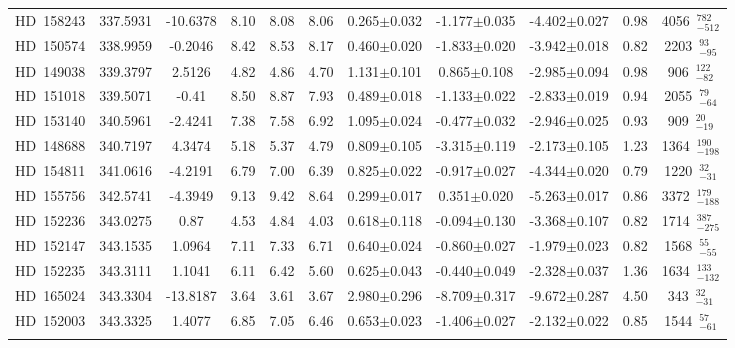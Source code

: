 {\begin{longtable}{lcccccccccc}
\noalign{\smallskip}
HD~158243 & 337.5931 & -10.6378 & 8.10 & 8.08 & 8.06 & 0.265$\pm$0.032 & -1.177$\pm$0.035 & -4.402$\pm$0.027 & 0.98 & 4056~$_{-512}^{782}$ \\
\noalign{\smallskip}
HD~150574 & 338.9959 & -0.2046 & 8.42 & 8.53 & 8.17 & 0.460$\pm$0.020 & -1.833$\pm$0.020 & -3.942$\pm$0.018 & 0.82 & 2203~$_{-95}^{93}$ \\
\noalign{\smallskip}
HD~149038 & 339.3797 & 2.5126 & 4.82 & 4.86 & 4.70 & 1.131$\pm$0.101 & 0.865$\pm$0.108 & -2.985$\pm$0.094 & 0.98 & 906~$_{-82}^{122}$ \\
\noalign{\smallskip}
HD~151018 & 339.5071 & -0.41 & 8.50 & 8.87 & 7.93 & 0.489$\pm$0.018 & -1.133$\pm$0.022 & -2.833$\pm$0.019 & 0.94 & 2055~$_{-64}^{79}$ \\
\noalign{\smallskip}
HD~153140 & 340.5961 & -2.4241 & 7.38 & 7.58 & 6.92 & 1.095$\pm$0.024 & -0.477$\pm$0.032 & -2.946$\pm$0.025 & 0.93 & 909~$_{-19}^{20}$ \\
\noalign{\smallskip}
HD~148688 & 340.7197 & 4.3474 & 5.18 & 5.37 & 4.79 & 0.809$\pm$0.105 & -3.315$\pm$0.119 & -2.173$\pm$0.105 & 1.23 & 1364~$_{-198}^{190}$ \\
\noalign{\smallskip}
HD~154811 & 341.0616 & -4.2191 & 6.79 & 7.00 & 6.39 & 0.825$\pm$0.022 & -0.917$\pm$0.027 & -4.344$\pm$0.020 & 0.79 & 1220~$_{-31}^{32}$ \\
\noalign{\smallskip}
HD~155756 & 342.5741 & -4.3949 & 9.13 & 9.42 & 8.64 & 0.299$\pm$0.017 & 0.351$\pm$0.020 & -5.263$\pm$0.017 & 0.86 & 3372~$_{-188}^{179}$ \\
\noalign{\smallskip}
HD~152236 & 343.0275 & 0.87 & 4.53 & 4.84 & 4.03 & 0.618$\pm$0.118 & -0.094$\pm$0.130 & -3.368$\pm$0.107 & 0.82 & 1714~$_{-275}^{387}$ \\
\noalign{\smallskip}
HD~152147 & 343.1535 & 1.0964 & 7.11 & 7.33 & 6.71 & 0.640$\pm$0.024 & -0.860$\pm$0.027 & -1.979$\pm$0.023 & 0.82 & 1568~$_{-55}^{55}$ \\
\noalign{\smallskip}
HD~152235 & 343.3111 & 1.1041 & 6.11 & 6.42 & 5.60 & 0.625$\pm$0.043 & -0.440$\pm$0.049 & -2.328$\pm$0.037 & 1.36 & 1634~$_{-132}^{133}$ \\
\noalign{\smallskip}
HD~165024 & 343.3304 & -13.8187 & 3.64 & 3.61 & 3.67 & 2.980$\pm$0.296 & -8.709$\pm$0.317 & -9.672$\pm$0.287 & 4.50 & 343~$_{-31}^{32}$ \\
\noalign{\smallskip}
HD~152003 & 343.3325 & 1.4077 & 6.85 & 7.05 & 6.46 & 0.653$\pm$0.023 & -1.406$\pm$0.027 & -2.132$\pm$0.022 & 0.85 & 1544~$_{-61}^{57}$ \\
\noalign{\smallskip}

\end{longtable}}
